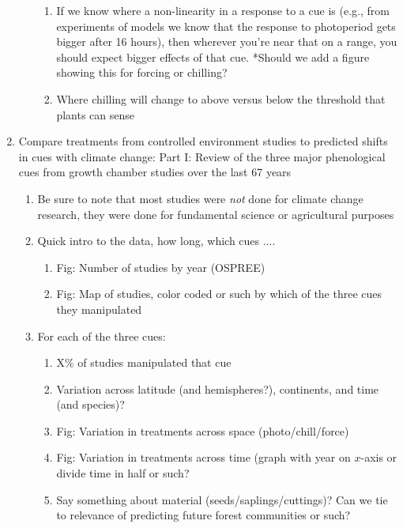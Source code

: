 \documentclass[11pt,letterpaper]{article}
\begin{document}
\begin{enumerate}
\begin{enumerate}
\begin{enumerate}
\item If we know where a non-linearity in a response to a cue is (e.g., from experiments of models we know that the response to photoperiod gets bigger after 16 hours), then wherever you're near that on a range, you should expect bigger effects of that cue. *Should we add a figure showing this for forcing or chilling? %
\item Where chilling will change to above versus below the threshold that plants can sense %
\end{enumerate}
\end{enumerate}
\item Compare treatments from controlled environment studies to predicted shifts in cues with climate change: Part I: Review of the three major phenological cues from growth chamber studies over the last 67 years %
\begin{enumerate}
\item Be sure to note that most studies were \emph{not} done for climate change research, they were done for fundamental science or agricultural purposes 
\item Quick intro to the data, how long, which cues .... 
\begin{enumerate}
\item Fig: Number of studies by year (OSPREE)
\item Fig: Map of studies, color coded or such by which of the three cues they manipulated
\end{enumerate}
\item For each of the three cues:
\begin{enumerate}
\item  X\% of studies manipulated that cue
\item Variation across latitude (and hemispheres?), continents, and time (and species)? 
\item Fig: Variation in treatments across space (photo/chill/force)
\item Fig: Variation in treatments across time (graph with year on $x$-axis or divide time in half or such? 
\item Say something about material (seeds/saplings/cuttings)? Can we tie to relevance of predicting future forest communities or such?

\end{enumerate}
\end{enumerate}
\end{enumerate}
\end{document}
